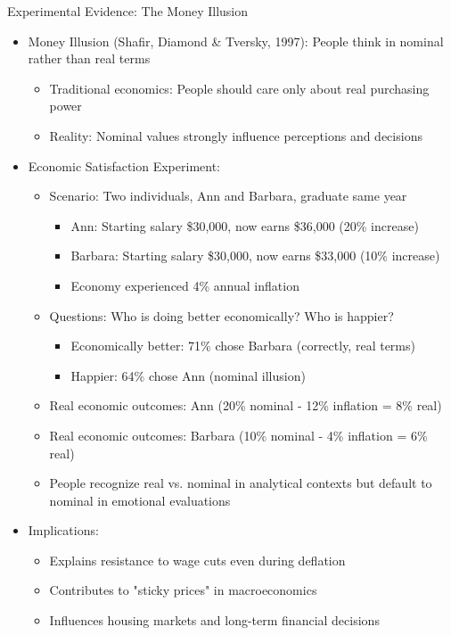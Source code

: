 \documentclass[10pt]{beamer}
\begin{document}
\begin{frame}{Experimental Evidence: The Money Illusion}
  \begin{itemize}[<+->]
    \item Money Illusion (Shafir, Diamond \& Tversky, 1997): People think in nominal rather than real terms
      \begin{itemize}
        \item Traditional economics: People should care only about real purchasing power
        \item Reality: Nominal values strongly influence perceptions and decisions
      \end{itemize}
    \item Economic Satisfaction Experiment:
      \begin{itemize}
        \item Scenario: Two individuals, Ann and Barbara, graduate same year
          \begin{itemize}
            \item Ann: Starting salary \$30,000, now earns \$36,000 (20\% increase)
            \item Barbara: Starting salary \$30,000, now earns \$33,000 (10\% increase)
            \item Economy experienced 4\% annual inflation
          \end{itemize}
        \item Questions: Who is doing better economically? Who is happier?
          \begin{itemize}
            \item Economically better: 71\% chose Barbara (correctly, real terms)
            \item Happier: 64\% chose Ann (nominal illusion)
          \end{itemize}
        \item Real economic outcomes: Ann (20\% nominal - 12\% inflation = 8\% real)
        \item Real economic outcomes: Barbara (10\% nominal - 4\% inflation = 6\% real)
        \item People recognize real vs. nominal in analytical contexts but default to nominal in emotional evaluations
      \end{itemize}
    \item Implications:
      \begin{itemize}
        \item Explains resistance to wage cuts even during deflation
        \item Contributes to "sticky prices" in macroeconomics
        \item Influences housing markets and long-term financial decisions
      \end{itemize}
  \end{itemize}
\end{frame}
\end{document}
